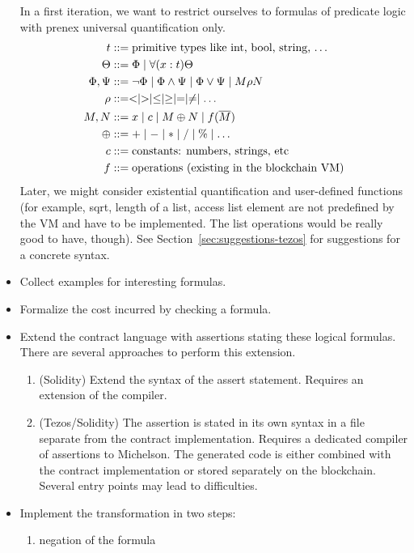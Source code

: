\documentclass{article}
\begin{document}
\begin{itemize}
  In a first iteration, we want to restrict ourselves to formulas of
  predicate logic with prenex universal quantification only.
  \begin{align*}
    t &::= \text{primitive types like int, bool, string, \dots} \\
    \Theta &::= \Phi \mid \forall (x:t) \Theta \\
    \Phi,\Psi &::= \neg\Phi \mid \Phi\wedge\Psi \mid \Phi\vee\Psi \mid
                M \rho N \\
    \rho &::= < \mid > \mid \le \mid \ge \mid = \mid \ne \mid \dots \\
    M, N &::= x \mid c \mid M \oplus N  \mid f (\overline M) \\
    \oplus &::= +\mid -\mid * \mid / \mid \% \mid \dots \\
    c &::= \text{constants: numbers, strings, etc} \\
    f &::= \text{operations (existing in the blockchain VM)}
  \end{align*}
  Later, we might consider existential quantification and user-defined
  functions (for example, sqrt, length of a list, access list element
  are not predefined by the VM and have to be implemented. The list
  operations would be really good to have, though). See
  Section~\ref{sec:suggestions-tezos} for suggestions for a concrete syntax.
\item Collect examples for interesting formulas.
\item Formalize the cost incurred by checking a formula.
\item Extend the contract language with assertions stating these logical
  formulas. There are several approaches to perform this extension.
  \begin{enumerate}
  \item (Solidity) Extend the syntax of the assert statement. Requires an extension of
    the compiler.
  \item (Tezos/Solidity) The assertion is stated in its own syntax in a file separate from the
    contract implementation. Requires a dedicated compiler of assertions to
    Michelson. The generated code is either combined with the contract implementation
    or stored separately on the blockchain. Several entry points may lead to difficulties.
  \end{enumerate}
\item Implement the transformation in two steps:
  \begin{enumerate}
  \item negation of the formula

\end{enumerate}
\end{itemize}
\end{document}
